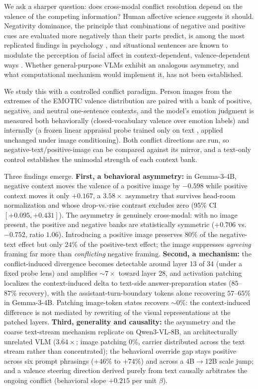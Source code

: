 \documentclass{article}
\newcommand{\gemma}{Gemma-3-4B}
\newcommand{\qwen}{Qwen3-VL-8B}
\begin{document}
We ask a sharper question: does cross-modal conflict resolution depend on the valence of the competing information? Human affective science suggests it should. Negativity dominance, the principle that combinations of negative and positive cues are evaluated more negatively than their parts predict, is among the most replicated findings in psychology \citep{rozin2001, baumeister2001}, and situational sentences are known to modulate the perception of facial affect in context-dependent, valence-dependent ways \citep{aviezer2008, aviezer2012}. Whether general-purpose VLMs exhibit an analogous asymmetry, and what computational mechanism would implement it, has not been established.

We study this with a controlled conflict paradigm. Person images from the extremes of the EMOTIC valence distribution \citep{kosti2019} are paired with a bank of positive, negative, and neutral one-sentence contexts, and the model's emotion judgment is measured both behaviorally (closed-vocabulary valence over emotion labels) and internally (a frozen linear appraisal probe trained only on text \citep{tak2025}, applied unchanged under image conditioning). Both conflict directions are run, so negative-text/positive-image can be compared against its mirror, and a text-only control establishes the unimodal strength of each context bank.

Three findings emerge. \textbf{First, a behavioral asymmetry:} in \gemma{}, negative context moves the valence of a positive image by $-0.598$ while positive context moves it only $+0.167$, a $3.58\times$ asymmetry that survives head-room normalization and whose drop-vs.-rise contrast excludes zero (95\% CI $[+0.095, +0.431]$). The asymmetry is genuinely cross-modal: with no image present, the positive and negative banks are statistically symmetric ($+0.706$ vs.\ $-0.752$, ratio $1.06$). Introducing a positive image preserves $80\%$ of the negative-text effect but only $24\%$ of the positive-text effect; the image suppresses \emph{agreeing} framing far more than \emph{conflicting} negative framing. \textbf{Second, a mechanism:} the conflict-induced divergence becomes detectable around layer 13 of 34 (under a fixed probe lens) and amplifies ${\sim}7\times$ toward layer 28, and activation patching localizes the context-induced delta to text-side answer-preparation states ($85$--$87\%$ recovery), with the assistant-turn-boundary tokens alone recovering $57$--$65\%$ in \gemma{}. Patching image-token states recovers ${\sim}0\%$: the context-induced difference is not mediated by rewriting of the visual representations at the patched layers. \textbf{Third, generality and causality:} the asymmetry and the coarse text-stream mechanism replicate on \qwen{}, an architecturally unrelated VLM ($3.64\times$; image patching $0\%$, carrier distributed across the text stream rather than concentrated); the behavioral override gap stays positive across six prompt phrasings ($+46\%$ to $+74\%$) and across a $4$B$\to$12B scale jump; and a valence steering direction derived purely from text causally arbitrates the ongoing conflict (behavioral slope $+0.215$ per unit $\beta$).
\end{document}
